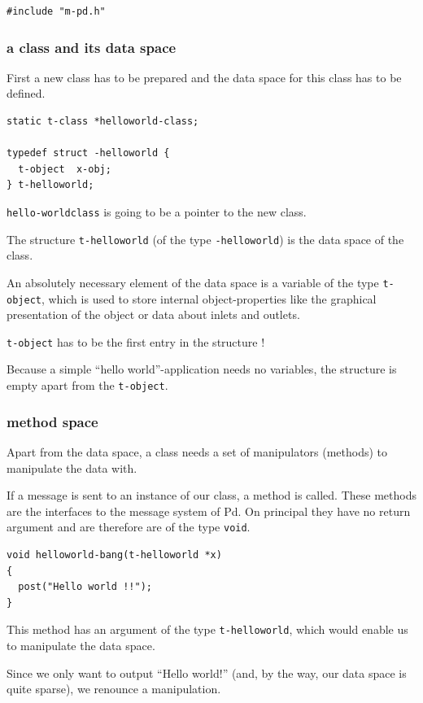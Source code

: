 \documentclass{ppgmus}
\begin{document}
\begin{verbatim}
#include "m-pd.h"
\end{verbatim}

\subsubsection{a class and its data space}
First a new class has to be prepared and the data space for this class has to be defined.

\begin{verbatim}
static t-class *helloworld-class;

typedef struct -helloworld {
  t-object  x-obj;
} t-helloworld;
\end{verbatim}

\verb+hello-worldclass+ is going to be a pointer to the new class.

The structure \verb+t-helloworld+ (of the type \verb+-helloworld+) is
the data space of the class.

An absolutely necessary element of the data space is a variable of the type
\verb+t-object+, which is used to store internal object-properties like
the graphical presentation of the object or data about inlets and outlets.

\verb+t-object+ has to be the first entry in the structure !

Because a simple ``hello world''-application needs no variables,
the structure is empty apart from the \verb+t-object+.


\subsubsection{method space}
Apart from the data space, a class needs a set of manipulators (methods) to
manipulate the data with.

If a message is sent to an instance of our class, a method is called.
These methods are the interfaces to the message system of Pd.
On principal they have no return argument and are therefore are of the
type \verb+void+.

\begin{verbatim}
void helloworld-bang(t-helloworld *x)
{
  post("Hello world !!");
}
\end{verbatim}


This method has an argument of the type \verb+t-helloworld+,
which would enable us to manipulate the data space.

Since we only want to output ``Hello world!''
(and, by the way, our data space is quite sparse),
we renounce a manipulation.
\end{document}
